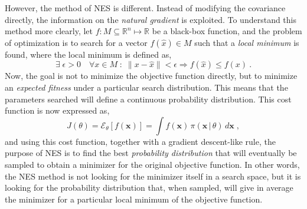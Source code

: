 However, the method of NES is different. Instead of modifying the covariance directly, the 
information on the \emph{natural gradient} is exploited. To understand this method more 
clearly, let \(f \colon M \subseteq \mathbb{R}^n \mapsto \mathbb{R}\) be a black-box 
function, and the problem of optimization is to search for a vector \(f(\hat{x}) \in M\) 
such that a \emph{local minimum} is found, where the local minimum is defined as,
\begin{equation}
    \exists \; \epsilon > 0 \quad \forall x \in M \; \colon \; 
    \lVert x - \hat{x} \rVert < \epsilon \Rightarrow f(\hat{x}) \leq f(x)
    \: .
    \label{eq:local-minimizer}
\end{equation}
Now, the goal is not to minimize the objective function directly, but to minimize an \emph{expected fitness} under a particular search distribution. This means that the parameters searched will define a continuous probability distribution. This cost function is now expressed as,
\begin{equation}
    J(\theta) = \mathcal{E}_{\theta} \left[ f(\bm{x}) \right] = 
    \int f(\bm{x}) \, \pi (\bm{x} \, \vert \, \theta) \, d \bm{x}
    \; ,
    \label{eq:expected-fitness}
\end{equation}
and using this cost function, together with a gradient descent-like rule, the purpose of NES is to find the best 
\emph{probability distribution} that will eventually be sampled to obtain a minimizer for 
the original objective function. In other words, the NES method is not looking for the 
minimizer itself in a search space, but it is looking for the probability distribution 
that, when sampled, will give in average the minimizer for a particular local minimum of 
the objective function.

